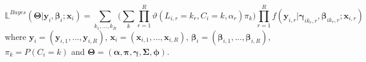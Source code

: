 \begin{equation}
 \mathbb{L}^{Bayes}(\boldsymbol{\Theta}| \boldsymbol{y}_i,\boldsymbol{\beta}_i; \boldsymbol{x}_{i})   =  \sum_{k_1,...,k_R}   \bigg(\sum_k \prod_{r=1}^R \vartheta(L_{i,r}=k_r,C_i=k,\alpha_r) \pi_k \bigg)  \prod_{r=1}^R f(\boldsymbol{y}_{i,r}|\boldsymbol{\gamma}_{ik_r,r},\boldsymbol{\beta}_{ik_r,r}; \boldsymbol{x}_{i,r}) 
\end{equation}
where $\boldsymbol{y}_i = (\boldsymbol{y}_{i,1},...,\boldsymbol{y}_{i,R})$, $\boldsymbol{x}_i = (\boldsymbol{x}_{i,1},...,\boldsymbol{x}_{i,R})$, $\boldsymbol{\beta}_i = (\boldsymbol{\beta}_{i,1},..., \boldsymbol{\beta}_{i,R})$, $\pi_k=P(C_i = k)$ and $\boldsymbol{\Theta}= (\boldsymbol{\alpha}, \boldsymbol{\pi},\boldsymbol{\gamma},\boldsymbol{\Sigma},\boldsymbol{\phi})$.
